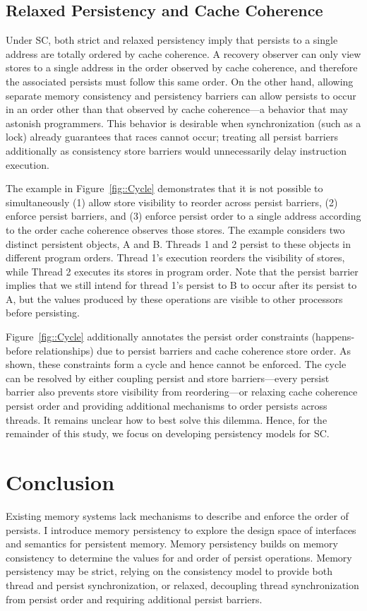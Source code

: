 \subsection{Relaxed Persistency and Cache Coherence}
Under SC, both strict and relaxed persistency imply that persists to a single address are totally ordered by cache coherence.
A recovery observer can only view stores to a single address in the order observed by cache coherence, and therefore the associated persists must follow this same order.
On the other hand, allowing separate memory consistency and persistency barriers can allow persists to occur in an order other than that observed by cache coherence---a behavior that may astonish programmers.
This behavior is desirable when synchronization (such as a lock) already guarantees that races cannot occur; treating all persist barriers additionally as consistency store barriers would unnecessarily delay instruction execution.



The example in Figure~\ref{fig::Cycle} demonstrates that it is not possible to simultaneously (1) allow store visibility to reorder across persist barriers, (2) enforce persist barriers, and (3) enforce persist order to a single address according to the order cache coherence observes those stores.
The example considers two distinct persistent objects, A and B.
Threads 1 and 2 persist to these objects in different program orders.
Thread 1's execution reorders the visibility of stores, while Thread 2 executes its stores in program order.
Note that the persist barrier implies that we still intend for thread 1's persist to B to occur after its persist to A, but the values produced by these operations are visible to other processors before persisting.

Figure~\ref{fig::Cycle} additionally annotates the persist order constraints (happens-before relationships) due to persist barriers and cache coherence store order.
As shown, these constraints form a cycle and hence cannot be enforced.
The cycle can be resolved by either coupling persist and store barriers---every persist barrier also prevents store visibility from reordering---or relaxing cache coherence persist order and providing additional mechanisms to order persists across threads.
It remains unclear how to best solve this dilemma.
Hence, for the remainder of this study, we focus on developing persistency models for SC.

\section{Conclusion}
\label{sec:Persistency:Conclusion}

Existing memory systems lack mechanisms to describe and enforce the order of persists.
I introduce memory persistency to explore the design space of interfaces and semantics for persistent memory.
Memory persistency builds on memory consistency to determine the values for and order of persist operations.
Memory persistency may be strict, relying on the consistency model to provide both thread and persist synchronization, or relaxed, decoupling thread synchronization from persist order and requiring additional persist barriers.
